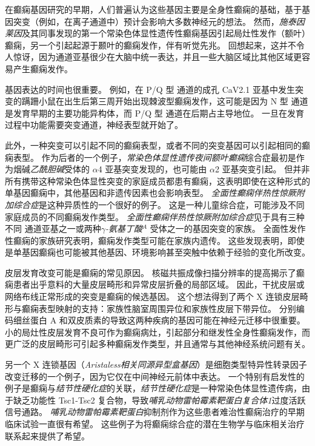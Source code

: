 在癫痫基因研究的早期，人们普遍认为这些基因主要是全身性癫痫的基础，基于基因突变（例如，在离子通道中）预计会影响大多数神经元的想法。
然而，\textit{施泰因莱因}及其同事发现的第一个常染色体显性遗传性癫痫基因引起局灶性发作（额叶）癫痫，另一个引起起源于颞叶的癫痫发作，伴有听觉先兆。
回想起来，这并不令人惊讶，因为通道亚基很少在大脑中统一表达，并且一些大脑区域比其他区域更容易产生癫痫发作。


基因表达的时间也很重要。
例如，在 P/Q 型  通道的成孔 CaV2.1 亚基中发生突变的蹒跚小鼠在出生后第三周开始出现棘波型癫痫发作，这可能是因为 N 型  通道是发育早期的主要功能异构体，而 P/Q 型  通道在后期占主导地位。
一旦在发育过程中功能需要突变通道，神经表型就开始了。


此外，一种突变可以引起不同的癫痫表型，或者不同的突变基因可以引起相同的癫痫表型。
作为后者的一个例子，\textit{常染色体显性遗传夜间额叶癫痫}综合症最初是作为烟碱\textit{乙酰胆碱}受体的 $\alpha$4 亚基突变发现的，也可能由 $\alpha$2 亚基突变引起。
但并非所有携带这种常染色体显性突变的家庭成员都患有癫痫，这表明即使在这种形式的单基因癫痫中，其他基因和非遗传因素也会影响表型。
\textit{全面性癫痫伴热性惊厥附加综合症}是这种异质性的一个很好的例子。 这是一种儿童综合症，可能涉及不同家庭成员的不同癫痫发作类型。
\textit{全面性癫痫伴热性惊厥附加综合症}见于具有三种不同  通道亚基之一或两种\textit{$\gamma$-氨基丁酸}$^A$ 受体之一的基因突变的家族。
全面性发作性癫痫的家族研究表明，癫痫发作类型可能在家族内遗传。
这些发现表明，即使是单基因癫痫也可能被其他基因、环境影响甚至突触中依赖于经验的变化所改变。


皮层发育改变可能是癫痫的常见原因。
核磁共振成像扫描分辨率的提高揭示了癫痫患者出乎意料的大量皮层畸形和异常皮层折叠的局部区域。
因此，干扰皮层或网络布线正常形成的突变是癫痫的候选基因。
这个想法得到了两个 X 连锁皮层畸形与癫痫表型映射的支持：家族性脑室周围异位和家族性皮层下带异位。
分别编码细丝蛋白 A 和双皮质素的导致这两种疾病的基因可能在神经元迁移中很重要。
小的局灶性皮层发育不良可作为癫痫病灶，引起部分和继发性全身性癫痫发作，而更广泛的皮层畸形可引起多种癫痫发作类型，并且通常与其他神经系统问题有关。


另一个 X 连锁基因（\textit{Aristaless相关同源异型盒基因}）是细胞类型特异性转录因子改变迁移的一个例子，因为它仅在中间神经元前体中表达。
一个特别有启发性的例子是癫痫与\textit{结节性硬化症}的关联，\textit{结节性硬化症}是一种常染色体显性遗传病，由于缺乏功能性 Tsc1-Tsc2 复合物，导致\textit{哺乳动物雷帕霉素靶蛋白复合体1}过度活跃信号通路。
\textit{哺乳动物雷帕霉素靶蛋白}抑制剂作为这些患者难治性癫痫治疗的早期临床试验一直很有希望。
这些例子为将癫痫综合症的潜在生物学与临床相关治疗联系起来提供了希望。


